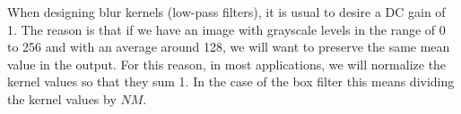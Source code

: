 When designing blur kernels (low-pass filters), it is usual to desire a DC gain of 1. The reason is that if we have an image with grayscale levels in the range of 0 to 256 and with an average around 128, we will want to preserve the same mean value in the output. For this reason, in most applications, we will normalize the kernel values so that they sum 1. In the case of the box filter this means dividing the kernel values by $NM$. 

%


